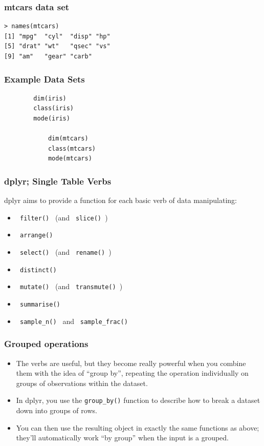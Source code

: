 \documentclass{beamer}
\begin{document}
\begin{frame}[fragile]
\frametitle{mtcars data set}
\begin{verbatim}
> names(mtcars)
[1] "mpg"  "cyl"  "disp" "hp"  
[5] "drat" "wt"   "qsec" "vs"  
[9] "am"   "gear" "carb"
\end{verbatim}
\end{frame}
	\begin{frame}[fragile]
	\frametitle{Example Data Sets}
		\begin{verbatim}
		dim(iris)
		class(iris)
		mode(iris)
		
			dim(mtcars)
			class(mtcars)
			mode(mtcars)
		\end{verbatim}
	\end{frame}
\begin{frame}
\frametitle{dplyr; Single Table Verbs}
dplyr aims to provide a function for each basic verb of data manipulating:
\begin{itemize}
	\item \texttt{ filter() } (and \texttt{  slice() })
	\item \texttt{ arrange() }
	\item \texttt{ select() } (and \texttt{  rename() })
	\item \texttt{ distinct() }
	\item \texttt{ mutate() } (and \texttt{  transmute() })
	\item \texttt{ summarise() }
	\item \texttt{ sample\_n() } and \texttt{  sample\_frac() }
\end{itemize}
%
\end{frame}
\begin{frame}
\frametitle{Grouped operations}
\begin{itemize}

\item The verbs are useful, but they become really powerful when you combine them with the idea of “group by”, repeating the operation individually on groups of observations within the dataset. 
\item In dplyr, you use the \texttt{group\_by()} function to describe how to break a dataset down into groups of rows. 
\item You can then use the resulting object in exactly the same functions as above; they’ll automatically work “by group” when the input is a grouped.
\end{itemize}
\end{frame}
\end{document}
